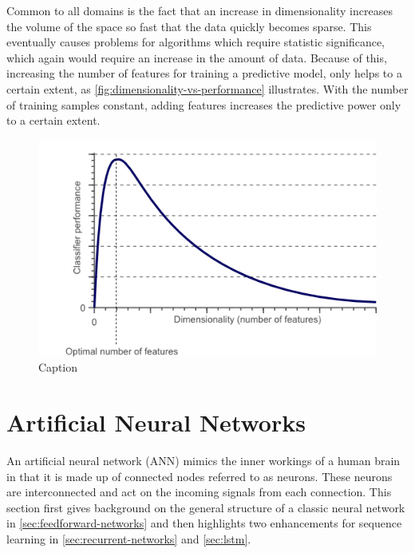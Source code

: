 Common to all domains is the fact that an increase in dimensionality increases the volume of the space so fast that the data quickly becomes sparse. This eventually causes problems for algorithms which require statistic significance, which again would require an increase in the amount of data.
Because of this, increasing the number of features for training a predictive model, only helps to a certain extent, as \autoref{fig:dimensionality-vs-performance} illustrates. With the number of training samples constant, adding features increases the predictive power only to a certain extent.

\begin{figure}
    \centering
    \includegraphics[width=\textwidth]{gfx/dimensionality_vs_performance.png}
    \caption{Caption}
    \label{fig:dimensionality-vs-performance}
\end{figure}

\section{Artificial Neural Networks}\label{sec:artificial-neural-networks}
An artificial neural network (ANN) mimics the inner workings of a human brain in that it is made up of connected nodes referred to as neurons. These neurons are interconnected and act on the incoming signals from each connection. This section first gives background on the general structure of a classic neural network in \autoref{sec:feedforward-networks} and then highlights two enhancements for sequence learning in \autoref{sec:recurrent-networks} and \autoref{sec:lstm}.


